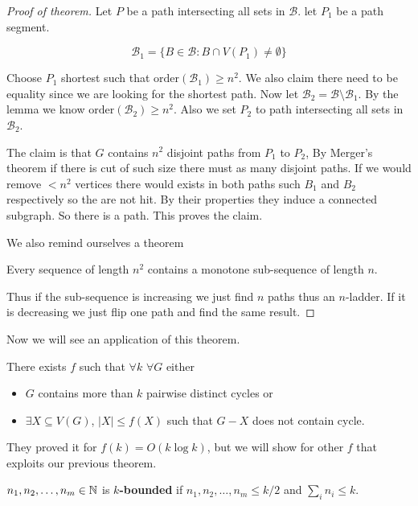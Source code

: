 \begin{proof}[Proof of theorem]
	Let $P$ be a path intersecting all sets in $\mathcal{B}$. let $P_{1}$ be a path segment.
	
	$$
	\mathcal{B}_{1} = \{B \in \mathcal{B} : B \cap V(P_{1}) \neq \emptyset\}
	$$
	
	Choose $P_{1}$ shortest such that $\text{order}(\mathcal{B}_{1}) \geq n^2$. We also claim there need to be equality since we are looking for the shortest path. Now let $\mathcal{B}_{2} = \mathcal{B} \setminus \mathcal{B}_{1}$. By the lemma we know $\text{order}(\mathcal{B}_{2}) \geq n^{2}$. Also we set $P_{2}$ to path intersecting all sets in $\mathcal{B}_{2}$.
	
	The claim is that $G$ contains $n^{2}$ disjoint paths from $P_{1}$ to $P_{2}$, By Merger's theorem if there is cut of such size there must as many disjoint paths. If we would remove $< n^{2}$ vertices there would exists in both paths such $B_{1}$ and $B_{2}$ respectively so the are not hit. By their properties they induce a connected subgraph. So there is a path. This proves the claim.
	
	We also remind ourselves a theorem
	
	\begin{thm}
		Every sequence of length $n^2$ contains a monotone sub-sequence of length $n$.
	\end{thm}
	
	Thus if the sub-sequence is increasing we just find $n$ paths thus an $n$-ladder. If it is decreasing we just flip one path and find the same result.
\end{proof}

Now we will see an application of this theorem.

\begin{thm}
	There exists $f$ such that $\forall k$ $\forall G$ either
	
	\begin{itemize}
		\item $G$ contains more than $k$ pairwise distinct cycles or
		\item $\exists X \subseteq V(G)$, $|X| \leq f(X)$ such that $G - X$ does not contain cycle.
	\end{itemize}
\end{thm}

They proved it for $f(k) = O(k \log k)$, but we will show for other $f$ that exploits our previous theorem.

\begin{defn}
	$n_{1}, n_{2}, \dots, n_{m} \in \mathbb{N}$ is \textbf{$k$-bounded} if $n_{1}, n_{2}, \dots, n_{m} \leq k/2$ and $\sum_{i} n_{i} \leq k$.
\end{defn}

